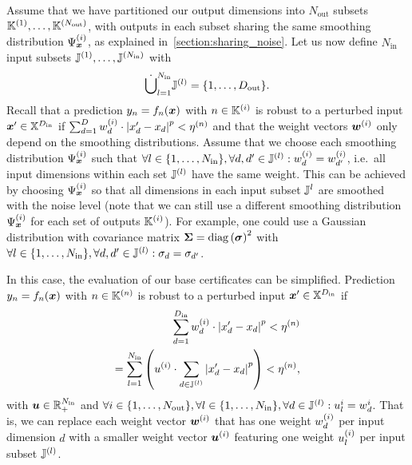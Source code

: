 Assume that we have partitioned our output dimensions into $N_\mathrm{out}$ subsets ${\mathbb{K}}^{(1)},\dots,{\mathbb{K}}^{(N_\mathrm{out})}$, with outputs in each subset sharing the same smoothing distribution $\Psi_{\bm{x}}^{(i)}$, as explained in~\autoref{section:sharing_noise}.
Let us now define $N_\mathrm{in}$ input subsets ${\mathbb{J}}^{(1)}, \dots, {\mathbb{J}}^{(N_\mathrm{in})}$ with 
\begin{equation}
    \dot{\bigcup}_{l=1}^{N_\mathrm{in}} {\mathbb{J}}^{(l)} = \{1, \dots, D_\mathrm{out}\}.
\end{equation}
Recall that a prediction ${y}_n = f_n({\bm{x}})$ with $n \in {\mathbb{K}}^{(i)}$ is robust to a perturbed input ${\bm{x}}' \in {\mathbb{X}}^{D_\mathrm{in}}$ if
$\sum_{d=1}^{D} {w}_d^{(i)} \cdot \left| {x}'_d - {x}_d \right|^p < \eta^{(n)}$ and that the weight vectors ${\bm{w}}^{(i)}$ only depend on the smoothing distributions.
Assume that we choose each smoothing distribution $\Psi_{\bm{x}}^{(i)}$ such that
$\forall l \in \{1,\dots,N_\mathrm{in}\}, \forall d, d' \in {\mathbb{J}}^{(l)}: {w}^{(i)}_d = {w}^{(i)}_{d'}$,
i.e.~all input dimensions within each set ${\mathbb{J}}^{(l)}$ have the same weight.
This can be achieved by choosing $\Psi_{\bm{x}}^{(i)}$ so that all dimensions in each input subset ${\mathbb{J}}^{l}$ are smoothed with the  noise level (note that we can still use a different smoothing distribution $\Psi_{\bm{x}}^{(i)}$ for each set of outputs ${\mathbb{K}}^{(i)}$).
For example, one could use a Gaussian distribution with covariance matrix ${\bm{\Sigma}} = \mathrm{diag}\left({\bm{\sigma}}\right)^2$
with  $\forall l \in \{1,\dots,N_\mathrm{in}\}, \forall d, d' \in {\mathbb{J}}^{(l)}: {\sigma}_d = {\sigma}_{d'}$.

In this case, the evaluation of our base certificates can be simplified. Prediction ${y}_n = f_n({\bm{x}})$ with $n \in {\mathbb{K}}^{(n)}$ is robust to a perturbed input ${\bm{x}}' \in {\mathbb{X}}^{D_\mathrm{in}}$ if 
\begin{align}
    \sum_{d=1}^{D_\mathrm{in}} {w}_d^{(i)} \cdot \left| {x}'_d - {x}_d \right|^p < \eta^{(n)}
    \\
    = \sum_{l=1}^{N_\mathrm{in}}
    \left(
    {u}^{(i)} \cdot \sum_{d \in {\mathbb{J}}^{(l)}} \left| {x}'_d - {x}_d \right|^p 
    \right)
    < \eta^{(n)},
\end{align}
with ${\bm{u}} \in {\mathbb{R}}_{+}^{N_\mathrm{in}}$ and
$\forall i \in \{1,\dots,N_\mathrm{out}\}, \forall l \in \{1,\dots,N_\mathrm{in}\}, \forall d \in {\mathbb{J}}^{(l)}: {u}_l^{i} = {w}_d^{i}$.
That is, we can replace each weight vector ${\bm{w}}^{(i)}$ that has one weight ${w}^{(i)}_d$ per input dimension $d$ with a smaller weight vector ${\bm{u}}^{(i)}$ featuring one weight ${u}^{(i)}_l$ per input subset ${\mathbb{J}}^{(l)}$.

